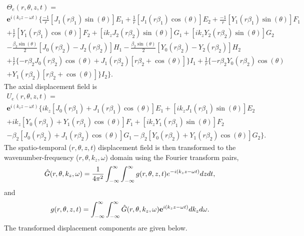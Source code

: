 \documentclass[11pt,cleanfoot]{asme2ej}
\begin{document}
\begin{multline}
    \Theta_e(r,\theta,z,t) =\\ \mathbf{e}^{i(k_{z}z-\omega t)}\bigg\{\frac{-1}{r}[J_1(r\beta_1)\sin(\theta)]E_1 + \frac{1}{r}[J_1(r\beta_1)\cos(\theta)]E_2 + \frac{-1}{r}[Y_1(r\beta_1)\sin(\theta)]F_1\\ + \frac{1}{r}[Y_1(r\beta_1)\cos(\theta)]F_2 + [ik_zJ_2(r\beta_2)\sin(\theta)]G_1 + [ik_zY_2(r\beta_2)\sin(\theta)]G_2\\ - \frac{\beta_2\sin(\theta)}{2}[J_0(r\beta_2)-J_2(r\beta_2)]H_1 - \frac{\beta_2\sin(\theta)}{2}[Y_0(r\beta_2)-Y_2(r\beta_2)]H_2\\ + \frac{1}{r}\{-r\beta_2J_0(r\beta_2)\cos(\theta) + J_1(r\beta_2)[r\beta_2+\cos(\theta)]\}I_1 + \frac{1}{r}\{-r\beta_2Y_0(r\beta_2)\cos(\theta)\\ + Y_1(r\beta_2)[r\beta_2+\cos(\theta)]\}I_2\bigg\}.
\end{multline}
The axial displacement field is
\begin{multline}
    U_e(r,\theta,z,t) =\\ \mathbf{e}^{i(k_{z}z-\omega t)}\bigg\{ik_z[J_{0}(r\beta_1) + J_{1}(r\beta_1)\cos(\theta)]E_1 + [ik_zJ_{1}(r\beta_1)\sin(\theta)]E_2\\ +  ik_z[Y_{0}(r\beta_1) + Y_{1}(r\beta_1)\cos(\theta)]F_1 +[ik_zY_{1}(r\beta_1)\sin(\theta)]F_2 \\
    - \beta_2[J_{0}(r\beta_2) + J_{1}(r\beta_2)\cos(\theta)]G_1 - \beta_2[Y_{0}(r\beta_2) + Y_{1}(r\beta_2)\cos(\theta)]G_2\bigg\}.
\end{multline}
The spatio-temporal ($r, \theta, z, t$) displacement field is then transformed to the wavenumber-frequency ($r, \theta, k_z, \omega$) domain using the Fourier transform pairs,
\begin{equation}\label{Forward fourier transform}
    \Hat{G}(r,\theta,k_{z},\omega) = \frac{1}{4\pi^{2}}\int^{\infty}_{-\infty}\int^{\infty}_{-\infty}g(r,\theta,z,t)e^{-i(k_{z}z-\omega t)}dzdt,
\end{equation}
and
\begin{equation}\label{Backward fourier transform}
    g(r,\theta,z,t) = \int^{\infty}_{-\infty}\int^{\infty}_{-\infty}\Hat{G}(r,\theta,k_{z},\omega)\mathbf{e}^{i(k_{z}z-\omega t)}dk_{z}d\omega.
\end{equation} 
The transformed displacement components are given below.
\end{document}
